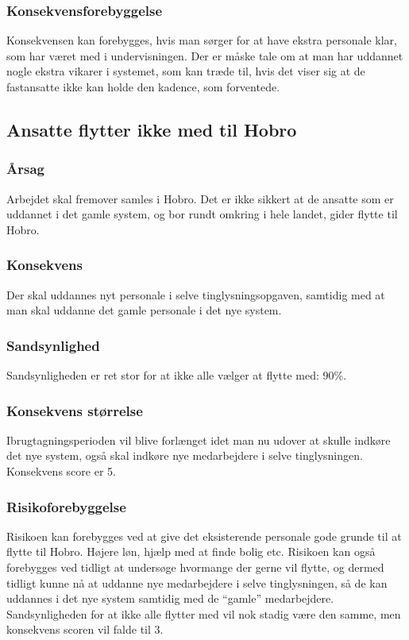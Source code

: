 \documentclass[10pt,a4paper,danish]{article}
\begin{document}
\subsubsection{Konsekvensforebyggelse}
Konsekvensen kan forebygges, hvis man sørger for at have ekstra personale klar, som har været med i undervisningen. Der er måske tale om at man har uddannet nogle ekstra vikarer i systemet, som kan træde til, hvis det viser sig at de fastansatte ikke kan holde den kadence, som forventede.


\subsection{Ansatte flytter ikke med til Hobro}
\subsubsection{Årsag}
Arbejdet skal fremover samles i Hobro. Det er ikke sikkert at de ansatte som er uddannet i det gamle system, og bor rundt omkring i hele landet, gider flytte til Hobro.

\subsubsection{Konsekvens}
Der skal uddannes nyt personale i selve tinglysningsopgaven, samtidig med at man skal uddanne det gamle personale i det nye system.

\subsubsection{Sandsynlighed}
Sandsynligheden er ret stor for at ikke alle vælger at flytte med: 90\%.

\subsubsection{Konsekvens størrelse}
Ibrugtagningsperioden vil blive forlænget idet man nu udover at skulle indkøre det nye system, også skal indkøre nye medarbejdere i selve tinglysningen. Konsekvens score er 5.

\subsubsection{Risikoforebyggelse}
Risikoen kan forebygges ved at give det eksisterende personale gode grunde til at flytte til Hobro. Højere løn, hjælp med at finde bolig etc. Risikoen kan også forebygges ved tidligt at undersøge hvormange der gerne vil flytte, og dermed tidligt kunne nå at uddanne nye medarbejdere i selve tinglysningen, så de kan uddannes i det nye system samtidig med de "`gamle"' medarbejdere. Sandsynligheden for at ikke alle flytter med vil nok stadig være den samme, men konsekvens scoren vil falde til 3.
\end{document}
